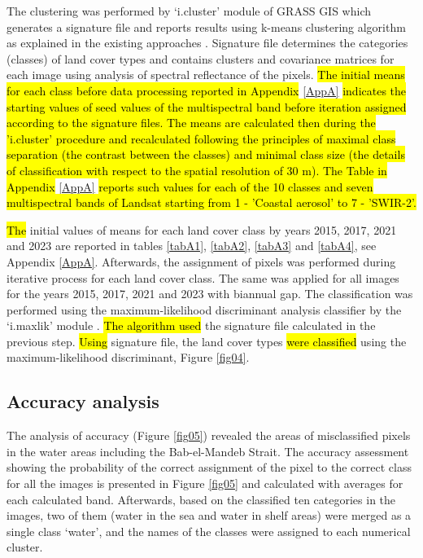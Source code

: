 \documentclass[jimaging,article,submit,pdftex,moreauthors]{Definitions/mdpi}
\begin{document}
The clustering was performed by ‘i.cluster’ module of GRASS GIS which generates a signature file and reports results using k-means clustering algorithm as explained in the existing approaches \cite{5930121,10430357,Lemenkova202315,5739741}.\hl{ } Signature file determines the categories (classes) of land cover types\hl{ }and contains\hl{ }clusters and covariance matrices for each image using analysis of spectral reflectance of the pixels. \hl{The initial means for each class before data processing reported in Appendix} \ref{AppA} \hl{indicates the starting values of seed values of the multispectral band before iteration assigned according to the signature files. The means are calculated then during the 'i.cluster' procedure and recalculated following the principles of maximal class separation (the contrast between the classes) and minimal class size (the details of classification with respect to the spatial resolution of 30 m). The Table in Appendix} \ref{AppA} \hl{reports such values for each of the 10 classes and seven multispectral bands of Landsat starting from 1 - 'Coastal aerosol' to 7 - 'SWIR-2'.} 

\hl{The} initial values of means for each land cover class by years 2015, 2017, 2021 and 2023 are reported in tables \ref{tabA1}, \ref{tabA2}, \ref{tabA3} and \ref{tabA4}, see Appendix \ref{AppA}. Afterwards, the assignment of pixels was performed during iterative process for each land cover class. The same was applied for all images for the years 2015, 2017, 2021 and 2023 with biannual gap. The classification was performed using the maximum-likelihood discriminant analysis classifier by the ‘i.maxlik’ module \cite{CHOWDHURY2024100800,Lemenkova202323}. \hl{The algorithm used} the signature file\hl{ }calculated in the previous step. \hl{Using} signature file, the land cover types\hl{ were classified }using the maximum-likelihood discriminant, Figure \ref{fig04}.

\subsection{Accuracy analysis}
 
The analysis of accuracy (Figure \ref{fig05}) revealed the areas of misclassified pixels in the water areas including the Bab-el-Mandeb Strait. The accuracy assessment showing the probability of the correct assignment of the pixel to the correct class for all the images is presented in Figure \ref{fig05} and calculated with averages for each calculated band. Afterwards, based on the classified ten categories in the images, two of them (water in the sea and water in shelf areas) were merged as a single class ‘water’, and the names of the classes were assigned to each numerical cluster. 
\end{document}

